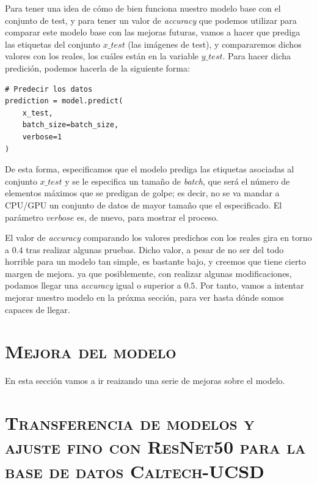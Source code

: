 \documentclass[11pt,a4paper]{article}
\begin{document}
Para tener una idea de cómo de bien funciona nuestro modelo base con el conjunto de test, y para tener un valor de
\textit{accuracy} que podemos utilizar para comparar este modelo base con las mejoras futuras, vamos a hacer que prediga
las etiquetas del conjunto $x\_test$ (las imágenes de test), y compararemos dichos valores con los reales, los cuáles están
en la variable $y\_test$. Para hacer dicha predición, podemos hacerla de la siguiente forma:

\begin{lstlisting}
# Predecir los datos
prediction = model.predict(
    x_test,
    batch_size=batch_size,
    verbose=1
)
\end{lstlisting}

De esta forma, especificamos que el modelo prediga las etiquetas asociadas al conjunto $x\_test$ y se le especifica un tamaño
de \textit{batch}, que será el número de elementos máximos que se predigan de golpe; es decir, no se va mandar a CPU/GPU un
conjunto de datos de mayor tamaño que el especificado. El parámetro $verbose$ es, de nuevo, para mostrar el proceso.

El valor de \textit{accuracy} comparando los valores predichos con los reales gira en torno a $0.4$ tras realizar
algunas pruebas. Dicho valor, a pesar de no ser del todo horrible para un modelo tan simple, es bastante bajo, y creemos
que tiene cierto margen de mejora. ya que posiblemente, con realizar algunas modificaciones, podamos llegar una \textit{accuracy}
igual o superior a $0.5$. Por tanto, vamos a intentar mejorar nuestro modelo en la próxma sección,
para ver hasta dónde somos capaces de llegar.

\section{\textsc{Mejora del modelo}}

En esta sección vamos a ir reaizando una serie de mejoras sobre el modelo.

\section{\textsc{Transferencia de modelos y ajuste fino con ResNet50 para la base de datos Caltech-UCSD}}

\newpage



\end{document}
